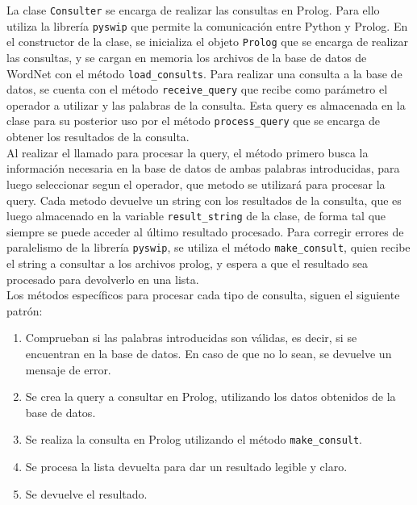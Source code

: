 \documentclass[12pt]{article}
\begin{document}
La clase \texttt{Consulter} se encarga de realizar las consultas en Prolog. Para ello utiliza la librería \texttt{pyswip} que permite la comunicación entre Python y Prolog. En el constructor de la clase, se inicializa el objeto \texttt{Prolog} que se encarga de realizar las consultas, y se cargan en memoria los archivos de la base de datos de WordNet con el método \texttt{load\_consults}. Para realizar una consulta a la base de datos, se cuenta con el método \texttt{receive\_query} que recibe como parámetro el operador a utilizar y las palabras de la consulta. Esta query es almacenada en la clase para su posterior uso por el  método \texttt{process\_query} que se encarga de obtener los resultados de la consulta. \\

Al realizar el llamado para procesar la query, el método primero busca la información necesaria en la base de datos de ambas palabras introducidas, para luego seleccionar segun el operador, que metodo se utilizará para procesar la query. Cada metodo devuelve un string con los resultados de la consulta, que es luego almacenado en la variable \texttt{result\_string} de la clase, de forma tal que siempre se puede acceder al último resultado procesado. Para corregir errores de paralelismo de la librería \texttt{pyswip}, se utiliza el método \texttt{make\_consult}, quien recibe el string a consultar a los archivos prolog, y espera a que el resultado sea procesado para devolverlo en una lista. \\

Los métodos específicos para procesar cada tipo de consulta, siguen el siguiente patrón: \\

\begin{enumerate}

    \item Comprueban si las palabras introducidas son válidas, es decir, si se encuentran en la base de datos. En caso de que no lo sean, se devuelve un mensaje de error.
    \item Se crea la query a consultar en Prolog, utilizando los datos obtenidos de la base de datos.
    \item Se realiza la consulta en Prolog utilizando el método \texttt{make\_consult}.
    \item Se procesa la lista devuelta para dar un resultado legible y claro.
    \item Se devuelve el resultado.

\end{enumerate}
\end{document}

